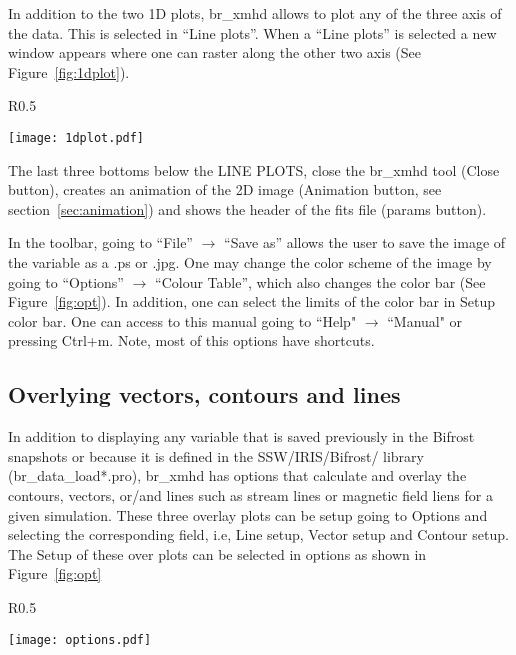 \documentclass[12pt,preprint]{aastex}
\begin{document}
In addition to the two 1D plots, br\_xmhd allows to plot any of the three axis of the data. This is selected
in ``Line plots''. When a ``Line plots'' is selected a new window appears where one can 
raster along the other two axis (See Figure~\ref{fig:1dplot}). 

\begin{wrapfigure}{R}{0.5\textwidth}
\vspace{-1.cm}
\begin{center}
	\texttt{[image: 1dplot.pdf]}
\end{center}
\vspace{-0.56cm}
\caption{\label{fig:1dplot} Screenshot of the Lines setup.}
\vspace{-1.cm}
\end{wrapfigure}

The last three bottoms below the LINE PLOTS,  close the br\_xmhd tool (Close button), 
creates an animation of the 2D image (Animation button, see section~\ref{sec:animation}) 
and shows the header of the fits file (params button). 

In the toolbar, going to ``File'' $\rightarrow$ ``Save as'' allows the user to save the image of the variable 
as a .ps or .jpg. One may change the color scheme of the image by going to ``Options'' $\rightarrow$ 
``Colour Table'', which also changes the color bar  (See Figure~\ref{fig:opt}). In addition, one can select 
the limits of the color bar in Setup color bar. One can access to this manual going to 
``Help" $\rightarrow$ ``Manual" or pressing Ctrl+m. Note, most of this options have shortcuts. 

\subsection{Overlying vectors, contours and lines}

In addition to displaying any variable that is saved previously in the Bifrost snapshots or
because it is defined in the SSW/IRIS/Bifrost/ library (br\_data\_load*.pro), br\_xmhd has options 
that calculate and overlay the contours, vectors, or/and lines such as stream lines or magnetic
field liens for a given simulation. These three overlay plots can be setup going to Options 
and selecting the corresponding field, i.e, Line setup, Vector setup and Contour setup. 
The Setup of these over plots can be selected in options as shown in Figure~\ref{fig:opt}

\begin{wrapfigure}{R}{0.5\textwidth}
\vspace{-1cm}
\begin{center}
	\texttt{[image: options.pdf]}
\end{center}
\vspace{-0.56cm}
\caption{\label{fig:opt} Screenshot of the Options tab.}
\vspace{-1.cm}
\end{wrapfigure}
\end{document}
